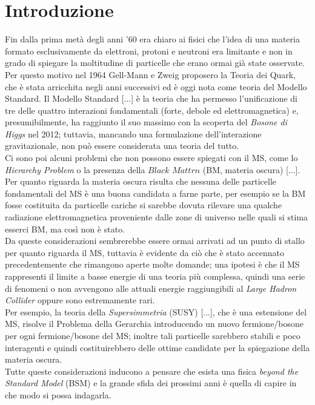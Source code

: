%
\section{Introduzione}
\label{sec:introduzione}
%
Fin dalla prima metà degli anni '60 era chiaro ai fisici che l'idea di una materia formato esclusivamente da elettroni, protoni e neutroni era limitante e non in grado di spiegare la moltitudine di particelle che erano ormai già state osservate. Per questo motivo nel 1964 Gell-Mann e Zweig proposero la Teoria dei Quark, che è stata arricchita negli anni successivi ed è oggi nota come teoria del Modello Standard. 
Il Modello Standard [...] è la teoria che ha permesso l'unificazione di tre delle quattro interazioni fondamentali (forte, debole ed elettromagnetica) e, presumibilmente, ha raggiunto il suo massimo con la scoperta del \textit{Bosone di Higgs} \cite{Bosone_di_Higgs} nel 2012; tuttavia, mancando una formulazione dell'interazione gravitazionale, non può essere considerata una teoria del tutto. \\
Ci sono poi alcuni problemi che non possono essere spiegati con il MS, come lo \textit{Hierarchy Problem} \cite{ProblemaGerarchia}
o la presenza della $\textit{Black Mattrn}$ (BM, materia oscura) [...]. Per quanto riguarda la materia oscura risulta che nessuna delle particelle fondamentali del MS è una buona candidata a farne parte, per esempio se la BM fosse costituita da particelle cariche si sarebbe dovuta rilevare una qualche radiazione elettromagnetica proveniente dalle zone di universo nelle quali si stima esserci BM, ma così non è stato.  \\
Da queste considerazioni sembrerebbe essere ormai arrivati ad un punto di stallo per quanto riguarda il MS, tuttavia è evidente da ciò che è stato accennato precedentemente che rimangono aperte molte domande; una ipotesi è che il MS rappresenti il limite a basse energie di una teoria più complessa, quindi una serie di fenomeni o non avvengono alle attuali energie raggiungibili al \textit{Large Hadron Collider} oppure sono estremamente rari. \\
Per esempio, la teoria della \textit{Supersimmetria} (SUSY) [...], che è una estensione del MS, risolve il Problema della Gerarchia introducendo un nuovo fermione/bosone per ogni fermione/bosone del MS; inoltre tali particelle sarebbero stabili e poco interagenti e quindi costituirebbero delle ottime candidate per la spiegazione della materia oscura. \\
Tutte queste considerazioni inducono a pensare che esista una fisica \textit{beyond the Standard Model} (BSM) e la grande sfida dei prossimi anni è quella di capire in che modo si possa indagarla. \\
